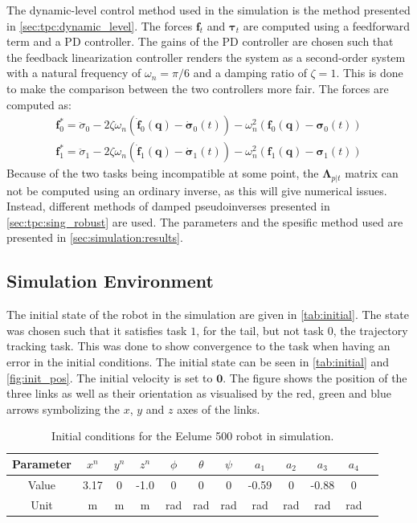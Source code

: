 The dynamic-level control method used in the simulation is the method presented in \autoref{sec:tpc:dynamic_level}. The forces $\bm{f}_t$ and $\bm{\tau}_t$ are computed using
a feedforward term and a PD controller. The gains of the PD controller are chosen
such that the feedback linearization controller renders the system as a second-order
system with a natural frequency of $\omega_n = \pi/6$ and a damping ratio of $\zeta = 1$.
This is done to make the comparison between the two controllers more fair. The forces
are computed as:
\begin{subequations}
\begin{align}
    \bm{f}_0^* = \ddot{\sigma}_0
    - 2 \zeta \omega_n \left(\dot{\bm{f}}_0(\bm{q}) - \dot{\bm{\sigma}}_0(t)\right)
    - \omega_n^2 \left(\bm{f}_0(\bm{q}) - \bm{\sigma}_0(t)\right) \\
    \bm{f}_1^* = \ddot{\sigma}_1
    - 2 \zeta \omega_n \left(\dot{\bm{f}}_1(\bm{q}) - \dot{\bm{\sigma}}_1(t)\right)
    - \omega_n^2 \left(\bm{f}_1(\bm{q}) - \bm{\sigma}_1(t)\right)
\end{align}
\end{subequations}
Because of the two tasks being incompatible at some point, the $\bm{\Lambda}_{p|t}$
matrix can not be computed using an ordinary inverse, as this will give numerical issues.
Instead, different methods of damped pseudoinverses presented in \autoref{sec:tpc:sing_robust}
are used. The parameters and the spesific method used are presented in \autoref{sec:simulation:results}.

\subsection{Simulation Environment}

The initial state of the robot in the simulation are given in \autoref{tab:initial}.
The state was chosen such that it satisfies task $1$, for the tail,
but not task $0$, the trajectory tracking task. This was done to show convergence
to the task when having an error in the initial conditions. The initial state
can be seen in \autoref{tab:initial} and \autoref{fig:init_pos}. The initial velocity
is set to $\bm{0}$. The figure
shows the position of the three links as well as their orientation as visualised
by the red, green and blue arrows symbolizing the $x$, $y$ and $z$ axes of the
links.
\begin{table}[h!]
    \centering
    \begin{tabular}{|c|c|c|c|c|c|c|c|c|c|c|c|}
        \hline
        Parameter & $x^n$ & $y^n$ & $z^n$ & $\phi$ & $\theta$ & $\psi$ & $a_1$ & $a_2$ & $a_3$ & $a_4$ \\ \hline
        Value & 3.17 & 0 & -1.0 & 0 & 0 & 0 & -0.59 & 0 & -0.88 & 0 \\ \hline
        Unit & m & m & m & rad & rad & rad & rad & rad & rad & rad \\
        \hline
    \end{tabular}
    \caption{Initial conditions for the Eelume 500 robot in simulation.}
    \label{tab:initial}
\end{table}

